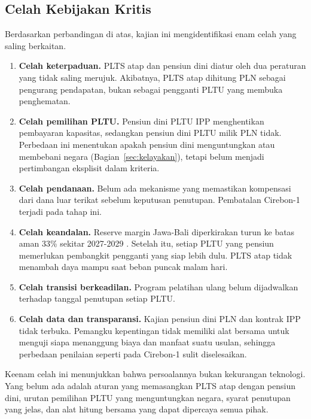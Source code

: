\subsection{Celah Kebijakan Kritis}

Berdasarkan perbandingan di atas, kajian ini mengidentifikasi enam celah yang saling berkaitan.

\begin{enumerate}
  \item \textbf{Celah keterpaduan.} PLTS atap dan pensiun dini diatur oleh dua peraturan yang tidak saling merujuk. Akibatnya, PLTS atap dihitung PLN sebagai pengurang pendapatan, bukan sebagai pengganti PLTU yang membuka penghematan.
  \item \textbf{Celah pemilihan PLTU.} Pensiun dini PLTU IPP menghentikan pembayaran kapasitas, sedangkan pensiun dini PLTU milik PLN tidak. Perbedaan ini menentukan apakah pensiun dini menguntungkan atau membebani negara (Bagian~\ref{sec:kelayakan}), tetapi belum menjadi pertimbangan eksplisit dalam kriteria.
  \item \textbf{Celah pendanaan.} Belum ada mekanisme yang memastikan kompensasi dari dana luar terikat sebelum keputusan penutupan. Pembatalan Cirebon-1 terjadi pada tahap ini.
  \item \textbf{Celah keandalan.} Reserve margin Jawa-Bali diperkirakan turun ke batas aman 33\% sekitar 2027-2029 \cite{B-PETROMINDO-RESERVE}. Setelah itu, setiap PLTU yang pensiun memerlukan pembangkit pengganti yang siap lebih dulu. PLTS atap tidak menambah daya mampu saat beban puncak malam hari.
  \item \textbf{Celah transisi berkeadilan.} Program pelatihan ulang belum dijadwalkan terhadap tanggal penutupan setiap PLTU.
  \item \textbf{Celah data dan transparansi.} Kajian pensiun dini PLN dan kontrak IPP tidak terbuka. Pemangku kepentingan tidak memiliki alat bersama untuk menguji siapa menanggung biaya dan manfaat suatu usulan, sehingga perbedaan penilaian seperti pada Cirebon-1 sulit diselesaikan.
\end{enumerate}

Keenam celah ini menunjukkan bahwa persoalannya bukan kekurangan teknologi. Yang belum ada adalah aturan yang memasangkan PLTS atap dengan pensiun dini, urutan pemilihan PLTU yang menguntungkan negara, syarat penutupan yang jelas, dan alat hitung bersama yang dapat dipercaya semua pihak.
